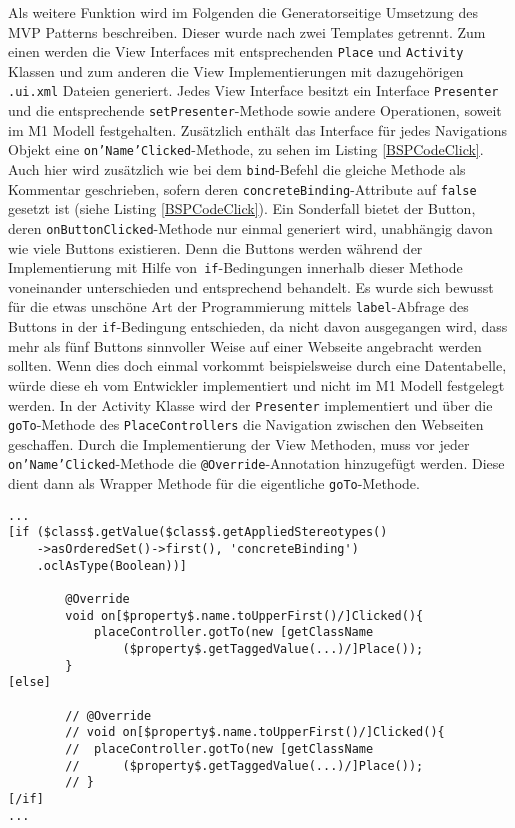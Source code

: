 Als weitere Funktion wird im Folgenden die Generatorseitige Umsetzung des MVP Patterns beschreiben. Dieser wurde nach zwei Templates getrennt. Zum einen werden die View Interfaces mit entsprechenden \texttt{Place} und \texttt{Activity} Klassen und zum anderen die View Implementierungen mit dazugehörigen \texttt{.ui.xml} Dateien generiert.
Jedes View Interface besitzt ein Interface \texttt{Presenter} und die entsprechende \texttt{setPresenter}-Methode sowie andere Operationen, soweit im M1 Modell festgehalten. Zusätzlich enthält das Interface für jedes Navigations Objekt eine \texttt{on'Name'Clicked}-Methode, zu sehen im Listing \ref{BSPCodeClick}. Auch hier wird zusätzlich wie bei dem \texttt{bind}-Befehl die gleiche Methode als Kommentar geschrieben, sofern deren \texttt{concreteBinding}-Attribute auf \texttt{false} gesetzt ist (siehe Listing \ref{BSPCodeClick}). Ein Sonderfall bietet der Button, deren \texttt{onButtonClicked}-Methode nur einmal generiert wird, unabhängig davon wie viele Buttons existieren. Denn die Buttons werden während der Implementierung mit Hilfe von\texttt{ if}-Bedingungen innerhalb dieser Methode voneinander unterschieden und entsprechend behandelt. Es wurde sich bewusst für die etwas unschöne Art der Programmierung mittels \texttt{label}-Abfrage des Buttons in der \texttt{if}-Bedingung entschieden, da nicht davon ausgegangen wird, dass mehr als fünf Buttons sinnvoller Weise auf einer Webseite angebracht werden sollten. Wenn dies doch einmal vorkommt beispielsweise durch eine Datentabelle, würde diese eh vom Entwickler implementiert und nicht im M1 Modell festgelegt werden.
In der Activity Klasse wird der \texttt{Presenter} implementiert und über die \texttt{goTo}-Methode des \texttt{PlaceControllers} die Navigation zwischen den Webseiten geschaffen. Durch die Implementierung der View Methoden, muss vor jeder \texttt{on'Name'Clicked}-Methode die \texttt{@Override}-Annotation hinzugefügt werden. Diese dient dann als Wrapper Methode für die eigentliche \texttt{goTo}-Methode.
\lstset{language=mtl}
\begin{lstlisting}[caption={Auszug der Generieung der \texttt{on'Name'Clicked}-Methode}, label={BSPCodeClick}]
...
[if ($class$.getValue($class$.getAppliedStereotypes()
	->asOrderedSet()->first(), 'concreteBinding')
	.oclAsType(Boolean))]
						
		@Override
		void on[$property$.name.toUpperFirst()/]Clicked(){
			placeController.gotTo(new [getClassName
				($property$.getTaggedValue(...)/]Place());
		}
[else]

		// @Override
		// void on[$property$.name.toUpperFirst()/]Clicked(){
		//	placeController.gotTo(new [getClassName
		//		($property$.getTaggedValue(...)/]Place());
		// }
[/if]
...
\end{lstlisting}

